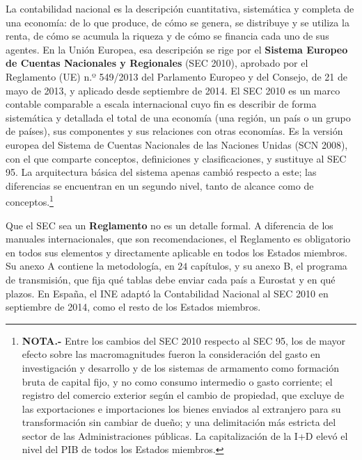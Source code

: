 \documentclass[10pt,a4paper]{article}
\newcounter{anexo}
\begin{document}
La contabilidad nacional es la descripción cuantitativa, sistemática y completa de una economía: de lo que produce, de cómo se genera, se distribuye y se utiliza la renta, de cómo se acumula la riqueza y de cómo se financia cada uno de sus agentes. En la Unión Europea, esa descripción se rige por el \textbf{Sistema Europeo de Cuentas Nacionales y Regionales} (SEC 2010), aprobado por el Reglamento (UE) n.º 549/2013 del Parlamento Europeo y del Consejo, de 21 de mayo de 2013, y aplicado desde septiembre de 2014. El SEC 2010 es un marco contable comparable a escala internacional cuyo fin es describir de forma sistemática y detallada el total de una economía (una región, un país o un grupo de países), sus componentes y sus relaciones con otras economías. Es la versión europea del Sistema de Cuentas Nacionales de las Naciones Unidas (SCN 2008), con el que comparte conceptos, definiciones y clasificaciones, y sustituye al SEC 95. La arquitectura básica del sistema apenas cambió respecto a este; las diferencias se encuentran en un segundo nivel, tanto de alcance como de conceptos.\footnote{%
    \textbf{NOTA.-} Entre los cambios del SEC 2010 respecto al SEC 95, los de mayor efecto sobre las macromagnitudes fueron la consideración del gasto en investigación y desarrollo y de los sistemas de armamento como formación bruta de capital fijo, y no como consumo intermedio o gasto corriente; el registro del comercio exterior según el cambio de propiedad, que excluye de las exportaciones e importaciones los bienes enviados al extranjero para su transformación sin cambiar de dueño; y una delimitación más estricta del sector de las Administraciones públicas. La capitalización de la I+D elevó el nivel del PIB de todos los Estados miembros.
}

Que el SEC sea un \textbf{Reglamento} no es un detalle formal. A diferencia de los manuales internacionales, que son recomendaciones, el Reglamento es obligatorio en todos sus elementos y directamente aplicable en todos los Estados miembros. Su anexo A contiene la metodología, en $24$ capítulos, y su anexo B, el programa de transmisión, que fija qué tablas debe enviar cada país a Eurostat y en qué plazos. En España, el INE adaptó la Contabilidad Nacional al SEC 2010 en septiembre de 2014, como el resto de los Estados miembros.
\end{document}
